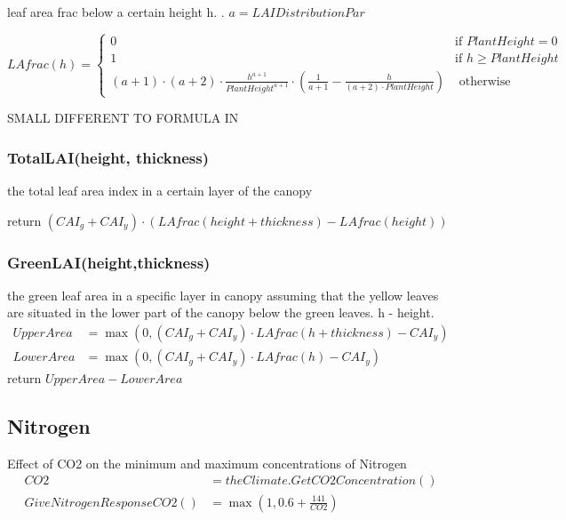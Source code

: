 \documentclass[%
]{scrartcl}
\newcommand\mymarginpar[1]{\marginpar {\flushleft\bfseries\scriptsize #1}}
\begin{document}
 \mymarginpar{LAIDistributionPar}
   leaf area frac below a certain height h.  
   \citep{olesen2004simulation}.  $a=LAIDistributionPar$
  
  $ LAfrac(h) = 
   \begin{cases}
   0 & \text{if } PlantHeight =0 \\
   1 & \text{if }  h \ge PlantHeight \\
    (a+1)  \cdot  (a+2) 
          \cdot  \tfrac{h^{a+1}}{PlantHeight^{a+1}}  
          \cdot    \left( \tfrac{1}{a+1}-\tfrac{h}{(a+2)  \cdot  PlantHeight}\right) &
          \text{ otherwise}
   \end{cases}     $

SMALL DIFFERENT TO FORMULA IN \citep{olesen2004simulation}


\subsubsection*{TotalLAI(height, thickness)}
the total leaf area index in a certain layer of the canopy

return $(CAI_g+CAI_y)  \cdot  (LAfrac(height+thickness)  - LAfrac(height))$


\subsubsection*{GreenLAI(height,thickness)}
the green leaf area in a specific layer in canopy
 assuming that the yellow leaves are situated in the lower part of the canopy
 below the green leaves. h - height.    
    \begin{align*}    
   UpperArea  & =  \max(0,(CAI_g+CAI_y)  \cdot  LAfrac(h+thickness)-CAI_y) \\
  LowerArea  & =  \max(0,(CAI_g+CAI_y)   \cdot  LAfrac(h)-CAI_y)    
   \end{align*} 
return $UpperArea-LowerArea$   
  
%


\subsection{Nitrogen}
Effect of CO2 on the minimum and maximum concentrations of Nitrogen
\begin{align*}
  CO2 & = theClimate.GetCO2Concentration() \\
GiveNitrogenResponseCO2() & = \max(1,0.6+\tfrac{141}{CO2})   
\end{align*}  
\end{document}
